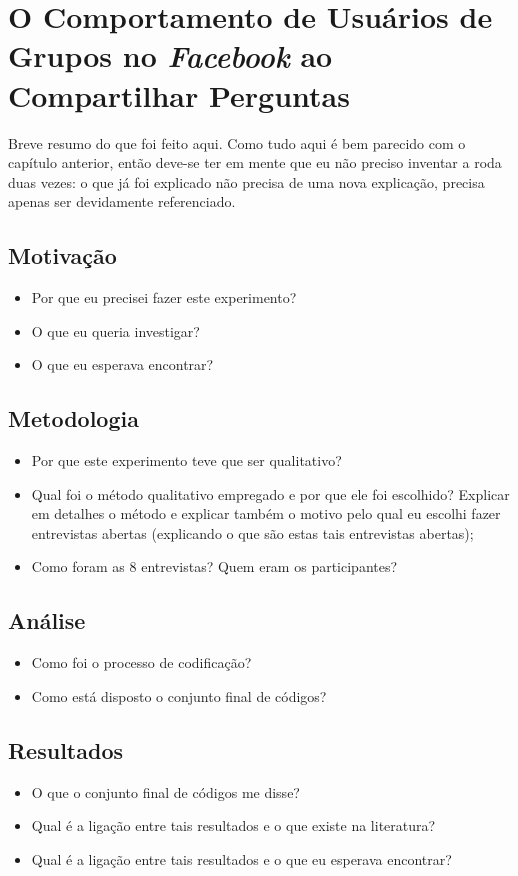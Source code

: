\chapter{O Comportamento de Usuários de Grupos no \textit{Facebook} ao Compartilhar Perguntas}

Breve resumo do que foi feito aqui. Como tudo aqui é bem parecido com o capítulo anterior, então deve-se ter em mente que eu não preciso inventar a roda duas vezes: o que já foi explicado não precisa de uma nova explicação, precisa apenas ser devidamente referenciado.
\section{Motivação}
\begin{itemize}
\item Por que eu precisei fazer este experimento? 
\item O que eu queria investigar?
\item O que eu esperava encontrar?
\end{itemize}
\section{Metodologia}
\begin{itemize}
\item Por que este experimento teve que ser qualitativo?
\item Qual foi o método qualitativo empregado e por que ele foi escolhido? Explicar em detalhes o método e explicar também o motivo pelo qual eu escolhi fazer entrevistas abertas (explicando o que são estas tais entrevistas abertas);
\item Como foram as 8 entrevistas? Quem eram os participantes?
\end{itemize}
\section{Análise}
\begin{itemize}
\item Como foi o processo de codificação?
\item Como está disposto o conjunto final de códigos?
\end{itemize}
\section{Resultados}
\begin{itemize}
\item O que o conjunto final de códigos me disse?
\item Qual é a ligação entre tais resultados e o que existe na literatura?
\item Qual é a ligação entre tais resultados e o que eu esperava encontrar?
\end{itemize}
